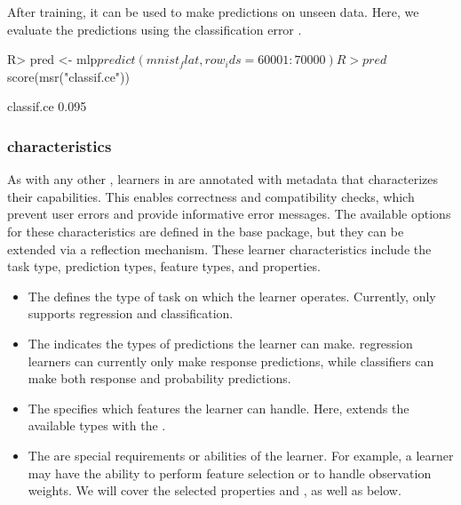\documentclass[article]{jss}
\theoremstyle{definition}
\begin{document}
After training, it can be used to make predictions on unseen data.
Here, we evaluate the predictions using the classification error .

\begin{CodeInput}
R> pred <- mlp$predict(mnist_flat, row_ids = 60001:70000)
R> pred$score(msr("classif.ce"))
\end{CodeInput}

\begin{CodeOutput}
classif.ce
     0.095
\end{CodeOutput}

\subsubsection[Learner characteristics]{ characteristics}\label{sec:learner-characteristics}

As with any other , learners in  are annotated with metadata that characterizes their capabilities.
This enables correctness and compatibility checks, which prevent user errors and provide informative error messages.
The available options for these characteristics are defined in the  base package, but they can be extended via a reflection mechanism.
These learner characteristics include the task type, prediction types, feature types, and properties.


\begin{itemize}
    \item The  defines the type of task on which the learner operates. Currently,  only supports regression and classification.
    \item The  indicates the types of predictions the learner can make. \torch{} regression learners can currently only make response predictions, while classifiers can make both response and probability predictions.
    \item The  specifies which features the learner can handle. Here, \mlrttorch{} extends the available types with the .
    \item The  are special requirements or abilities of the learner. For example, a learner may have the ability to perform feature selection or to handle observation weights. We will cover the selected properties  and , as well as  below.
\end{itemize}
\end{document}
